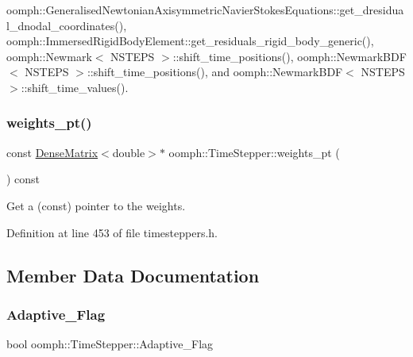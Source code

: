 oomph\+::\+Generalised\+Newtonian\+Axisymmetric\+Navier\+Stokes\+Equations\+::get\+\_\+dresidual\+\_\+dnodal\+\_\+coordinates(), oomph\+::\+Immersed\+Rigid\+Body\+Element\+::get\+\_\+residuals\+\_\+rigid\+\_\+body\+\_\+generic(), oomph\+::\+Newmark$<$ N\+S\+T\+E\+P\+S $>$\+::shift\+\_\+time\+\_\+positions(), oomph\+::\+Newmark\+B\+D\+F$<$ N\+S\+T\+E\+P\+S $>$\+::shift\+\_\+time\+\_\+positions(), and oomph\+::\+Newmark\+B\+D\+F$<$ N\+S\+T\+E\+P\+S $>$\+::shift\+\_\+time\+\_\+values().

\mbox{\label{classoomph_1_1TimeStepper_ac70698873c23a3a5963c76fecf9ed678}} 
\subsubsection{\texorpdfstring{weights\+\_\+pt()}{weights\_pt()}}
{\footnotesize\ttfamily const \hyperlink{classoomph_1_1DenseMatrix}{Dense\+Matrix}$<$double$>$$\ast$ oomph\+::\+Time\+Stepper\+::weights\+\_\+pt (\begin{DoxyParamCaption}{ }\end{DoxyParamCaption}) const\hspace{0.3cm}{\ttfamily [inline]}}



Get a (const) pointer to the weights. 



Definition at line 453 of file timesteppers.\+h.



\subsection{Member Data Documentation}
\mbox{\label{classoomph_1_1TimeStepper_afe6d4d7cf3e0b2a186694f24c8cf016f}} 
\subsubsection{\texorpdfstring{Adaptive\+\_\+\+Flag}{Adaptive\_Flag}}
{\footnotesize\ttfamily bool oomph\+::\+Time\+Stepper\+::\+Adaptive\+\_\+\+Flag\hspace{0.3cm}{\ttfamily [protected]}}



